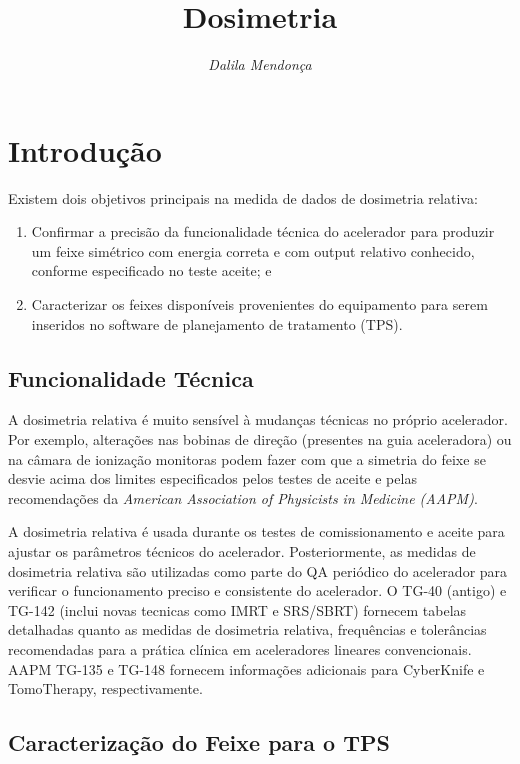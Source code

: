 \documentclass[11pt,a4paper]{article}
\title{\LobsterTwo\Huge{Dosimetria}}
\author{\LobsterTwo{Dosimetria Relativa}\nocite{*}}
\date{\LobsterTwo\textit{Dalila Mendonça}}
\newcounter{exemplo}
\begin{document}
	\maketitle


\section{Introdução}

	Existem dois objetivos principais na medida de dados de dosimetria relativa:
	
	\begin{enumerate}
		\item Confirmar a precisão da funcionalidade técnica do acelerador para produzir um feixe simétrico com energia correta e com output relativo conhecido, conforme especificado no teste aceite; e
		\item Caracterizar os feixes disponíveis provenientes do equipamento para serem inseridos no software de planejamento de tratamento (TPS).
	\end{enumerate}
	
\subsection{Funcionalidade Técnica}

	A dosimetria relativa é muito sensível à mudanças técnicas no próprio acelerador. Por exemplo, alterações nas bobinas de direção (presentes na guia aceleradora) ou na câmara de ionização monitoras podem fazer com que a simetria do feixe se desvie acima dos limites especificados pelos testes de aceite e pelas recomendações da \textit{American Association of Physicists in Medicine (AAPM)}.

	A dosimetria relativa é usada durante os testes de comissionamento e aceite para ajustar os parâmetros técnicos do acelerador. Posteriormente, as medidas de dosimetria relativa são utilizadas como parte do QA periódico do acelerador para verificar o funcionamento preciso e consistente do acelerador. O TG-40 (antigo) e TG-142 (inclui novas tecnicas como IMRT e SRS/SBRT) fornecem tabelas detalhadas quanto as medidas de dosimetria relativa, frequências e tolerâncias recomendadas para a prática clínica em aceleradores lineares convencionais. AAPM TG-135 e TG-148 fornecem informações adicionais para CyberKnife e TomoTherapy, respectivamente.

\subsection{Caracterização do Feixe para o TPS}
\end{document}
